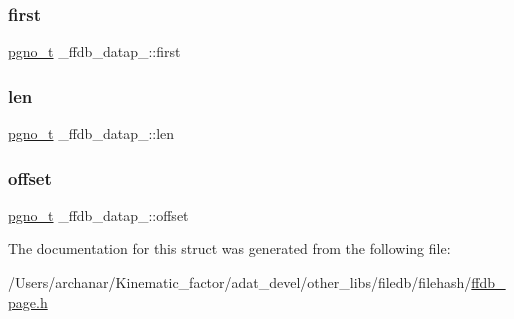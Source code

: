 \mbox{\label{struct__ffdb__datap___a45bb4391f88d605103aaf0f61a10f349}} 
\subsubsection{\texorpdfstring{first}{first}}
{\footnotesize\ttfamily \mbox{\hyperlink{other__libs_2filedb_2filehash_2ffdb__db_8h_a000813331643d38481142bcce7de1501}{pgno\+\_\+t}} \+\_\+ffdb\+\_\+datap\+\_\+\+::first}

\mbox{\label{struct__ffdb__datap___aec2dc3a3454339039f0c12598e3faad7}} 
\subsubsection{\texorpdfstring{len}{len}}
{\footnotesize\ttfamily \mbox{\hyperlink{other__libs_2filedb_2filehash_2ffdb__db_8h_a000813331643d38481142bcce7de1501}{pgno\+\_\+t}} \+\_\+ffdb\+\_\+datap\+\_\+\+::len}

\mbox{\label{struct__ffdb__datap___a27c6fdcb05f89592016f8f8cc141560a}} 
\subsubsection{\texorpdfstring{offset}{offset}}
{\footnotesize\ttfamily \mbox{\hyperlink{other__libs_2filedb_2filehash_2ffdb__db_8h_a000813331643d38481142bcce7de1501}{pgno\+\_\+t}} \+\_\+ffdb\+\_\+datap\+\_\+\+::offset}



The documentation for this struct was generated from the following file\+:\begin{DoxyCompactItemize}
\item 
/\+Users/archanar/\+Kinematic\+\_\+factor/adat\+\_\+devel/other\+\_\+libs/filedb/filehash/\mbox{\hyperlink{ffdb__page_8h}{ffdb\+\_\+page.\+h}}\end{DoxyCompactItemize}
